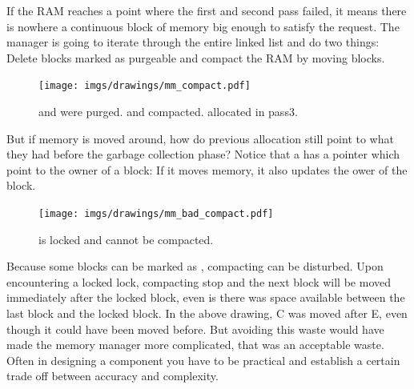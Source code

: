 \documentclass[book.tex]{subfiles}
\begin{document}
 \par
 If the RAM reaches a point where the first and second pass failed, it means there is nowhere a continuous block of memory big enough to satisfy the request. The manager is going to iterate through the entire linked list and do two things: Delete blocks marked as purgeable and compact the RAM by moving blocks.
  \par
\begin{figure}[H]
\centering
 \texttt{[image: imgs/drawings/mm\_compact.pdf]}
  \caption{ and  were purged.  and  compacted.  allocated in pass3.}
 \end{figure}
 \par
But if memory is moved around, how do previous allocation still point to what they had before the garbage collection phase? Notice that a  has a  pointer which point to the owner of a block: If it moves memory, it also updates the ower of the block.

   \par
\begin{figure}[H]
\centering
 \texttt{[image: imgs/drawings/mm\_bad\_compact.pdf]}
 \caption{ is locked and cannot be compacted.}
 \end{figure}
 \par
 Because some blocks can be marked as , compacting can be disturbed. Upon encountering a locked lock, compacting stop and the next block will be moved immediately after the locked block, even is there was space available between the last block and the locked block. In the above drawing, C was moved after E, even though it could have been moved before. But avoiding this waste would have made the memory manager more complicated, that was an acceptable waste. Often in designing a component you have to be practical and establish a certain trade off between accuracy and complexity.
\end{document}
